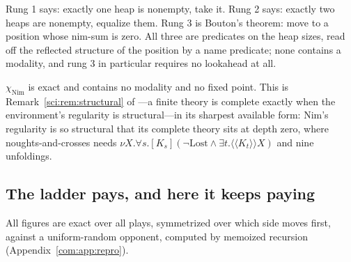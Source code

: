 Rung 1 says: exactly one heap is nonempty, take it. Rung 2 says: exactly two heaps are nonempty,
equalize them. Rung 3 is Bouton's theorem: move to a position whose nim-sum is zero. All three
are predicates on the heap sizes, read off the reflected structure of the position by a name
predicate; none contains a modality, and rung 3 in particular requires no lookahead at all.

\begin{observation}\label{com:complete-theory-nim-name}
$\chi_{\mathrm{Nim}}$ is exact and contains no modality and no fixed point. This is Remark~\ref{sci:rem:structural} of
\chSci---a finite theory is complete exactly when the environment's regularity is
structural---in its sharpest available form: Nim's regularity is so structural that its complete
theory sits at depth zero, where noughts-and-crosses needs $\nu X.\forall s.[K_s](\neg
\mathrm{Lost} \wedge \exists t. \langle\langle K_t\rangle\rangle X)$ and nine unfoldings.
\end{observation}

\subsection{The ladder pays, and here it keeps paying}\label{com:S11.2}

All figures are exact over all plays, symmetrized over which side moves first, against a
uniform-random opponent, computed by memoized recursion (Appendix~\ref{com:app:repro}).

